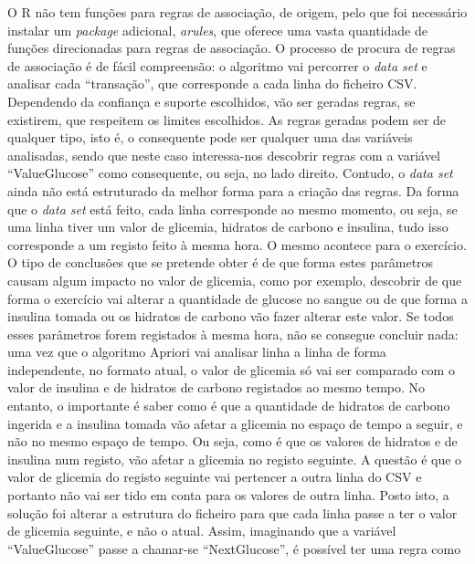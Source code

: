 O R não tem funções para regras de associação, de origem, pelo que foi necessário instalar um \textit{package} adicional, \textit{arules}, que oferece uma vasta quantidade de funções direcionadas para regras de associação. O processo de procura de regras de associação é de fácil compreensão: o algoritmo vai percorrer o \textit{data set} e analisar cada ``transação'', que corresponde a cada linha do ficheiro \ac{CSV}. Dependendo da confiança e suporte escolhidos, vão ser geradas regras, se existirem, que respeitem os limites escolhidos. As regras geradas podem ser de qualquer tipo, isto é, o consequente pode ser qualquer uma das variáveis analisadas, sendo que neste caso interessa-nos descobrir regras com a variável ``Value\textunderscore Glucose'' como consequente, ou seja, no lado direito. Contudo, o \textit{data set} ainda não está estruturado da melhor forma para a criação das regras. 
Da forma que o \textit{data set} está feito, cada linha corresponde ao mesmo momento, ou seja, se uma linha tiver um valor de glicemia, hidratos de carbono e insulina, tudo isso corresponde a um registo feito à mesma hora. O mesmo acontece para o exercício. O tipo de conclusões que se pretende obter é de que forma estes parâmetros causam algum impacto no valor de glicemia, como por exemplo, descobrir de que forma o exercício vai alterar a quantidade de glucose no sangue ou de que forma a insulina tomada ou os hidratos de carbono vão fazer alterar este valor. Se todos esses parâmetros forem registados à mesma hora, não se consegue concluir nada: uma vez que o algoritmo Apriori vai analisar linha a linha de forma independente, no formato atual, o valor de glicemia só vai ser comparado com o valor de insulina e de hidratos de carbono registados ao mesmo tempo. No entanto, o importante é saber como é que a quantidade de hidratos de carbono ingerida e a insulina tomada vão afetar a glicemia no espaço de tempo a seguir, e não no mesmo espaço de tempo. Ou seja, como é que os valores de hidratos e de insulina num registo, vão afetar a glicemia no registo seguinte. A questão é que o valor de glicemia do registo seguinte vai pertencer a outra linha do \ac{CSV} e portanto não vai ser tido em conta para os valores de outra linha. Posto isto, a solução foi alterar a estrutura do ficheiro para que cada linha passe a ter o valor de glicemia seguinte, e não o atual. Assim, imaginando que a variável ``Value\textunderscore Glucose'' passe a chamar-se ``Next\textunderscore Glucose'', é possível ter uma regra como

